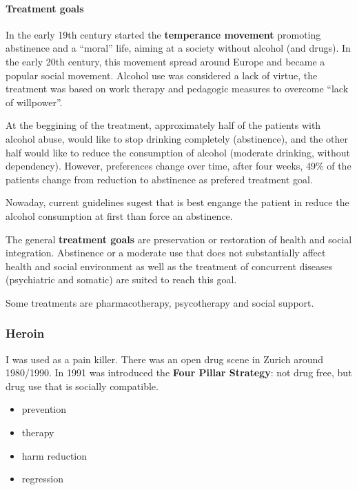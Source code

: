 \documentclass[12pt,article,oneside,a4paper]{memoir}
\begin{document}
\paragraph{Treatment goals} 
In the early 19th century started the \textbf{temperance movement} promoting abstinence and a ``moral'' life, aiming at a society without alcohol (and drugs). In the early 20th century, this movement spread around Europe and became a popular social movement. Alcohol use was considered a lack of virtue, the treatment was based on work therapy and pedagogic measures to overcome ``lack of willpower''.

At the beggining of the treatment, approximately half of the patients with alcohol abuse, would like to stop drinking completely (abstinence), and the other half would like to reduce the consumption of alcohol (moderate drinking, without dependency). However, preferences change over time, after four weeks, 49\% of the patients change from reduction to abstinence as prefered treatment goal.

Nowaday, current guidelines sugest that is best engange the patient in reduce the alcohol consumption at first than force an abstinence.

The general \textbf{treatment goals} are preservation or restoration of health and social integration. Abstinence or a moderate use that does not substantially affect health and social environment as well as the treatment of concurrent diseases (psychiatric and somatic) are suited to reach this goal.

Some treatments are pharmacotherapy, psycotherapy and social support.

\subsubsection{Heroin}
I was used as a pain killer. There was an open drug scene in Zurich around 1980/1990.
In 1991 was introduced the \textbf{Four Pillar Strategy}: not drug free, but drug use that is socially compatible.
\begin{itemize}
\item prevention
\item therapy
\item harm reduction
\item regression
\end{itemize}
\end{document}
